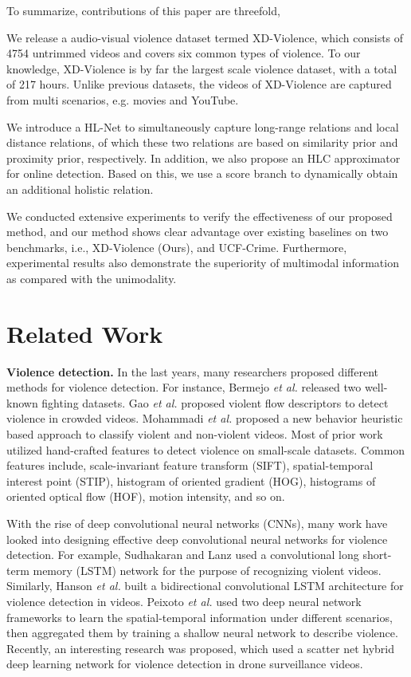 \documentclass[runningheads]{llncs}
\begin{document}
To summarize, contributions of this paper are threefold,

We release a audio-visual violence dataset termed XD-Violence, which consists of 4754 untrimmed videos and covers six common types of violence. To our knowledge, XD-Violence is by far the largest scale violence dataset, with a total of 217 hours. Unlike previous datasets, the videos of XD-Violence are captured from multi scenarios, e.g. movies and YouTube.

We introduce a HL-Net to simultaneously capture long-range relations and local distance relations, of which these two relations are based on similarity prior and proximity prior, respectively. In addition, we also propose an HLC approximator for online detection. Based on this, we use a score branch to dynamically obtain an additional holistic relation. 

We conducted extensive experiments to verify the effectiveness of our proposed method, and our method shows clear advantage over existing baselines on two benchmarks, i.e., XD-Violence (Ours), and UCF-Crime. Furthermore, experimental results also demonstrate the superiority of multimodal information as compared with the unimodality.

\section{Related Work}

\textbf{Violence detection.} In the last years, many researchers proposed different methods for violence detection. For instance, Bermejo \textit{et al.} \cite{nievas2011violence} released two well-known fighting datasets. Gao \textit{et al.} \cite{hassner2012violent} proposed violent flow descriptors to detect violence in crowded videos. Mohammadi \textit{et al.} \cite{mohammadi2016angry} proposed a new behavior heuristic based approach to classify violent and non-violent videos. Most of prior work utilized hand-crafted features to detect violence on small-scale datasets. Common features include, scale-invariant feature transform (SIFT), spatial-temporal interest point (STIP), histogram of oriented gradient (HOG), histograms of oriented optical flow (HOF), motion intensity, and so on.

With the rise of deep convolutional neural networks (CNNs), many work have looked into designing effective deep convolutional neural networks for violence detection. For example, Sudhakaran and Lanz \cite{sudhakaran2017learning} used a convolutional long short-term memory (LSTM) network for the purpose of recognizing violent videos. Similarly, Hanson \textit{et al.} \cite{hanson2018bidirectional} built a bidirectional convolutional LSTM architecture for violence detection in videos. Peixoto \textit{et al.} \cite{peixoto2019toward} used two deep neural network frameworks to learn the spatial-temporal information under different scenarios, then aggregated them by training a shallow neural network to describe violence. Recently, an interesting research \cite{singh2018eye} was proposed, which used a scatter net hybrid deep learning network for violence detection in drone surveillance videos.
\end{document}
